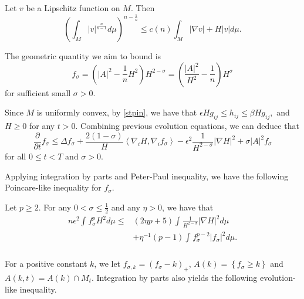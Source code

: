 \begin{lemma} \label{MSeu}
    Let $v$ be a Lipschitz function on $M$. Then
    \[\left( \int_{M}^{}\left| v \right| ^{\frac{n}{n-1}} d \mu  \right)^{n-\frac{1}{n}} \leq c(n)\int_{M}^{} \left| \nabla v \right| + H \left| v \right|  d \mu. \]
\end{lemma}

The geometric quantity we aim to bound is 
\[f_\sigma = \left( \left| A \right| ^2-\frac{1}{n}H^2 \right) H^{2-\sigma} = \left( \frac{\left| A \right| ^2}{H^2}-\frac{1}{n} \right) H^{\sigma} \]
for sufficient small $\sigma >0$.

Since $M$ is uniformly convex, by \autoref{stpin}, we have that $\epsilon H g_{ij }^{} \leq h_{ij }^{} \leq \beta H g_{ij }^{} ,$ and $H \geq 0$ for any $t>0$.  Combining previous evolution equations, we can deduce that
\begin{equation} \label{evof}
    \frac{\partial }{\partial t} f_\sigma \leq \Delta f_\sigma + \frac{2(1-\sigma )}{H}\left\langle \nabla _i H, \nabla_{i}^{} f_\sigma  \right\rangle - \epsilon ^2 \frac{1}{H^{2-\sigma }}\left| \nabla H \right| ^2+\sigma \left| A \right| ^2 f_\sigma
\end{equation}
for all $0 \leq t < T$ and $\sigma >0$. 

Applying integration by parts and Peter-Paul inequality, we have the following Poincare-like inequality for $f_\sigma $.

\begin{lemma}
    Let $p \geq 2$. For any $0 < \sigma \leq \frac{1}{2}$ and any $\eta >0$, we have that 
    \begin{equation}
    \begin{split}
        n \epsilon ^2 \int_{}^{}f_{\sigma }^{p} H^2d \mu \leq& \left( 2 \eta p+5 \right) \int_{}^{}\frac{1}{H^{2-\sigma }}\left| \nabla H \right| ^2 d \mu  \\
    &+ \eta ^{-1}\left( p-1 \right) \int_{}^{}f_{\sigma }^{p-2} \left| f_{\sigma }^{}  \right| ^2 d \mu .  \\
    \end{split}
    \end{equation} 
\end{lemma}

For a positive constant $k$, we let $f_{\sigma ,k}^{} =(f_{\sigma }^{} -k)_+$, $A(k)=\left\{ f_{\sigma }^{} \geq k \right\} $ and $A(k,t)=A(k)\cap M_t.$ Integration by parts also yields the following evolution-like inequality.

